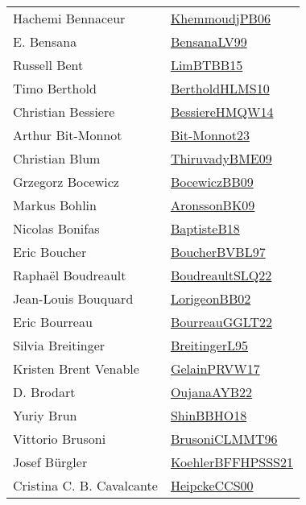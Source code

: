 {\begin{longtable}{p{4cm}p{20cm}}
Hachemi Bennaceur & \href{papers/KhemmoudjPB06.pdf}{KhemmoudjPB06}\cite{KhemmoudjPB06} \\
E. Bensana & \href{articles/BensanaLV99.pdf}{BensanaLV99}\cite{BensanaLV99} \\
Russell Bent & \href{papers/LimBTBB15.pdf}{LimBTBB15}\cite{LimBTBB15} \\
Timo Berthold & \href{papers/BertholdHLMS10.pdf}{BertholdHLMS10}\cite{BertholdHLMS10} \\
Christian Bessiere & \href{papers/BessiereHMQW14.pdf}{BessiereHMQW14}\cite{BessiereHMQW14} \\
Arthur Bit{-}Monnot & \href{papers/Bit-Monnot23.pdf}{Bit-Monnot23}\cite{Bit-Monnot23} \\
Christian Blum & \href{papers/ThiruvadyBME09.pdf}{ThiruvadyBME09}\cite{ThiruvadyBME09} \\
Grzegorz Bocewicz & \href{}{BocewiczBB09}\cite{BocewiczBB09} \\
Markus Bohlin & \href{papers/AronssonBK09.pdf}{AronssonBK09}\cite{AronssonBK09} \\
Nicolas Bonifas & \href{articles/BaptisteB18.pdf}{BaptisteB18}\cite{BaptisteB18} \\
Eric Boucher & \href{}{BoucherBVBL97}\cite{BoucherBVBL97} \\
Rapha{\"{e}}l Boudreault & \href{papers/BoudreaultSLQ22.pdf}{BoudreaultSLQ22}\cite{BoudreaultSLQ22} \\
Jean{-}Louis Bouquard & \href{}{LorigeonBB02}\cite{LorigeonBB02} \\
Eric Bourreau & \href{articles/BourreauGGLT22.pdf}{BourreauGGLT22}\cite{BourreauGGLT22} \\
Silvia Breitinger & \href{}{BreitingerL95}\cite{BreitingerL95} \\
Kristen Brent Venable & \href{papers/GelainPRVW17.pdf}{GelainPRVW17}\cite{GelainPRVW17} \\
D. Brodart & \href{papers/OujanaAYB22.pdf}{OujanaAYB22}\cite{OujanaAYB22} \\
Yuriy Brun & \href{articles/ShinBBHO18.pdf}{ShinBBHO18}\cite{ShinBBHO18} \\
Vittorio Brusoni & \href{papers/BrusoniCLMMT96.pdf}{BrusoniCLMMT96}\cite{BrusoniCLMMT96} \\
Josef B{\"{u}}rgler & \href{articles/KoehlerBFFHPSSS21.pdf}{KoehlerBFFHPSSS21}\cite{KoehlerBFFHPSSS21} \\
Cristina C. B. Cavalcante & \href{articles/HeipckeCCS00.pdf}{HeipckeCCS00}\cite{HeipckeCCS00} \\

\end{longtable}}
